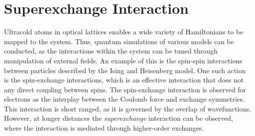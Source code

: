 \chapter{Superexchange Interaction}
Ultracold atoms in optical lattices enables a wide variety of Hamiltonians to be mapped to the system. Thus, quantum simulations of various models can be conducted, as the interactions within the system can be tuned through manipulation of external fields. An example of this is the spin-spin interactions between particles described by the Ising and Heisenberg model. One such action is the spin-exchange interactions, which is an effective interaction that does not any direct coupling between spins. The spin-exchange interaction is observed for electrons as the interplay between the Coulomb force and exchange symmetries. This interaction is short ranged, as it is governed by the overlap of wavefunctions. However, at longer distances  the \textit{superexchange} interaction can be observed, where the interaction is mediated through higher-order exchanges.

